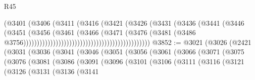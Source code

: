 \begin{lexlean}{R45}
\begin{coremodule}
                                                              (@3401
                                                                (@3406
                                                                  (@3411
                                                                    (@3416
                                                                      (@3421
                                                                        (@3426
                                                                          (@3431
                                                                            (@3436
                                                                              (@3441
                                                                                (@3446
                                                                                  (@3451
                                                                                    (@3456
                                                                                      (@3461
                                                                                        (@3466
                                                                                          (@3471
                                                                                            (@3476
                                                                                              (@3481
                                                                                                (@3486
                                                                                                  @3756)))))))))))))))))))))))))))))))))))))))))))))))
@3852 := @3021
    (@3026
      (@2421
        (@3031
          (@3036
            (@3041
              (@3046
                (@3051
                  (@3056
                    (@3061
                      (@3066
                        (@3071
                          (@3075
                            (@3076
                              (@3081
                                (@3086
                                  (@3091
                                    (@3096
                                      (@3101
                                        (@3106
                                          (@3111
                                            (@3116
                                              (@3121
                                                (@3126
                                                  (@3131
                                                    (@3136
                                                      (@3141

\end{coremodule}
\end{lexlean}

